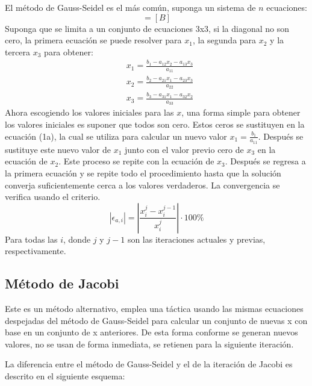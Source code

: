 El método de Gauss-Seidel es el más común, suponga un sistema de $n$ ecuaciones:
\begin{equation}
    [A][X] =[B]
\end{equation}
Suponga que se limita a un conjunto de ecuaciones 3x3, si la diagonal no son cero, la primera ecuación se puede resolver para $x_1$, la segunda para $x_2$ y la tercera $x_3$ para obtener:
\begin{align*}
    &x_1 =\frac{b_1 - a_{12}x_2 - a_{13}x_3}{a_{11}}\\
    &x_2 =\frac{b_2 - a_{21}x_1 - a_{23}x_3}{a_{22}}\\
    &x_3 =\frac{b_3 - a_{31}x_1 - a_{32}x_2}{a_{33}}
\end{align*}
Ahora escogiendo los valores iniciales para las $x$, una forma simple para obtener los valores iniciales es suponer que todos son cero. Estos ceros se sustituyen en la ecuación (1a), la cual se utiliza para calcular un nuevo valor $x_1=\frac{b_1}{a_{11}}$. Después se sustituye este nuevo valor de $x_1$ junto con el valor previo cero de $x_3$ en la ecuación de $x_2$. Este proceso se repite con la ecuación de $x_3$. Después se regresa a la primera ecuación y se repite todo el procedimiento hasta que la solución converja suficientemente cerca a los valores verdaderos. La convergencia se verifica usando el criterio.
\begin{equation}
\left\lvert \epsilon_{a,i}\right\rvert = \left\lvert \frac{x_i^j - x_i^{j - 1}}{x_i^j}\right\rvert\cdot 100\%  
\end{equation}
Para todas las $i$, donde $j$ y $j-1$ son las iteraciones actuales y previas, respectivamente.

\subsection{Método de Jacobi}

Este es un método alternativo, emplea una táctica usando las mismas ecuaciones despejadas del método de Gauss-Seidel para calcular un conjunto de nuevas x con base en un conjunto de x anteriores. De esta forma conforme se generan nuevos valores, no se usan de forma inmediata, se retienen para la siguiente iteración.

La diferencia entre el método de Gauss-Seidel y el de la iteración de Jacobi es descrito en el siguiente esquema:

